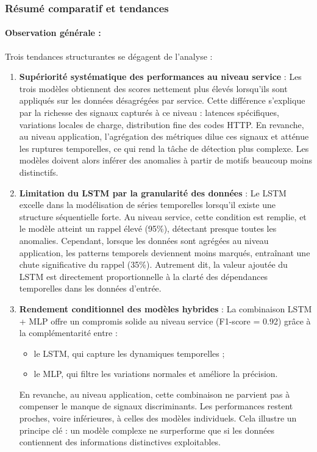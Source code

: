 \documentclass[conference]{IEEEtran}
\begin{document}
\subsubsection{Résumé comparatif et tendances}

\paragraph{Observation générale :}
Trois tendances structurantes se dégagent de l'analyse :
\begin{enumerate}
    \item \textbf{Supériorité systématique des performances au niveau service} :  
    Les trois modèles obtiennent des scores nettement plus élevés lorsqu'ils sont appliqués sur les données désagrégées par service. Cette différence s’explique par la richesse des signaux capturés à ce niveau : latences spécifiques, variations locales de charge, distribution fine des codes HTTP.  
    En revanche, au niveau application, l’agrégation des métriques dilue ces signaux et atténue les ruptures temporelles, ce qui rend la tâche de détection plus complexe. Les modèles doivent alors inférer des anomalies à partir de motifs beaucoup moins distinctifs.

    \item \textbf{Limitation du LSTM par la granularité des données} :  
    Le LSTM excelle dans la modélisation de séries temporelles lorsqu'il existe une structure séquentielle forte. Au niveau service, cette condition est remplie, et le modèle atteint un rappel élevé (95\%), détectant presque toutes les anomalies.  
    Cependant, lorsque les données sont agrégées au niveau application, les patterns temporels deviennent moins marqués, entraînant une chute significative du rappel (35\%). Autrement dit, la valeur ajoutée du LSTM est directement proportionnelle à la clarté des dépendances temporelles dans les données d’entrée.

    \item \textbf{Rendement conditionnel des modèles hybrides} :  
    La combinaison LSTM + MLP offre un compromis solide au niveau service (F1-score = 0.92) grâce à la complémentarité entre :
    \begin{itemize}
        \item le LSTM, qui capture les dynamiques temporelles ;
        \item le MLP, qui filtre les variations normales et améliore la précision.
    \end{itemize}
    En revanche, au niveau application, cette combinaison ne parvient pas à compenser le manque de signaux discriminants. Les performances restent proches, voire inférieures, à celles des modèles individuels. Cela illustre un principe clé : un modèle complexe ne surperforme que si les données contiennent des informations distinctives exploitables.
\end{enumerate}
\end{document}
